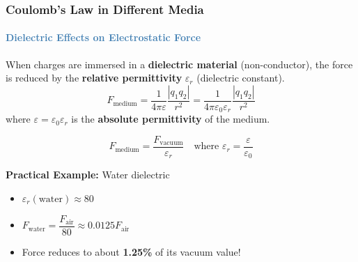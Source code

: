\begin{frame}
\frametitle{\textsf{\textbf{Coulomb's Law in Different Media}}}
\framesubtitle{\textcolor{steelblue}{Dielectric Effects on Electrostatic Force}}

\vspace{-0.05cm}

\begin{keybox}
\vspace{0.1cm}
When charges are immersed in a \textbf{dielectric material} (non-conductor), the force is reduced by the \textbf{relative permittivity} $\varepsilon_r$ (dielectric constant).
\begin{equation*}
\boxed{F_{\text{medium}} = \frac{1}{4\pi\varepsilon} \frac{|q_1 q_2|}{r^2} = \frac{1}{4\pi\varepsilon_0 \varepsilon_r} \frac{|q_1 q_2|}{r^2}}
\end{equation*}
where $\varepsilon = \varepsilon_0 \varepsilon_r$ is the \textbf{absolute permittivity} of the medium.
\end{keybox}

\vspace{0.3cm}

\begin{examplebox}
\vspace{0.15cm}
\begin{equation*}
\boxed{F_{\text{medium}} = \frac{F_{\text{vacuum}}}{\varepsilon_r}} \quad \text{where } \varepsilon_r = \frac{\varepsilon}{\varepsilon_0}
\end{equation*}

\vspace{0.2cm}

\textbf{Practical Example:} Water dielectric
\begin{itemize}
    \item $\varepsilon_r(\text{water}) \approx 80$
    \item $F_{\text{water}} = \dfrac{F_{\text{air}}}{80} \approx 0.0125 F_{\text{air}}$
    \item Force reduces to about \textbf{1.25\%} of its vacuum value!
\end{itemize}
\end{examplebox}

\vspace{0.25cm}


\end{frame}
